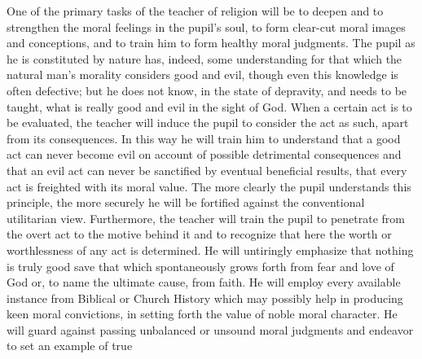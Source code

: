 One of the primary tasks of the teacher of religion will be to deepen and to strengthen the moral feelings in the pupil’s soul, to form clear-cut moral images and conceptions, and to train him to form healthy moral judgments. The pupil as he is constituted by nature has, indeed, some understanding for that which the natural man’s morality considers good and evil, though even this knowledge is often defective; but he does not know, in the state of depravity, and needs to be taught, what is really good and evil in the sight of God. When a certain act is to be evaluated, the teacher will induce the pupil to consider the act as such, apart from its consequences. In this way he will train him to understand that a good act can never become evil on account of possible detrimental consequences and that an evil act can never be sanctified by eventual beneficial results, that every act is freighted with its moral value. The more clearly the pupil understands this principle, the more securely he will be fortified against the conventional utilitarian view. Furthermore, the teacher will train the pupil to penetrate from the overt act to the motive behind it and to recognize that here the worth or worthlessness of any act is determined. He will untiringly emphasize that nothing is truly good save that which spontaneously grows forth from fear and love of God or, to name the ultimate cause, from faith. He will employ every available instance from Biblical or Church History which may possibly help in producing keen moral convictions, in setting forth the value of noble moral character. He will guard against passing unbalanced or unsound moral judgments and endeavor to set an example of true
